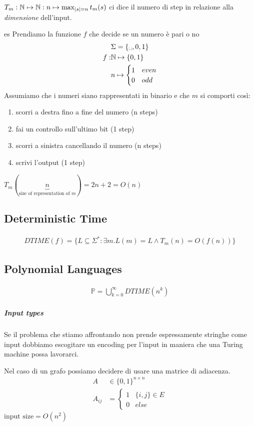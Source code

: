 \documentclass{article}
\newcommand{\tvs}[0]{\text{\textvisiblespace}}
\begin{document}
$T_m:\mathbb N\mapsto\mathbb N:n\mapsto \max_{|s|=n} t_m(s)$ ci dice il numero di step in relazione alla \textit{dimensione} dell'input.

\begin{callout}{es}
    Prendiamo la funzione $f$ che decide se un numero è pari o no 
    \begin{align*}
        &\Sigma=\{\tvs,0,1\} \\
        f:&\N\mapsto\{0,1\} \\
          &n\mapsto \begin{cases}
              1 & even \\
              0 & odd
          \end{cases}
    \end{align*}
    Assumiamo che i numeri siano rappresentati in binario e che $m$ si comporti così:
    \begin{enumerate}
        \item scorri a destra fino a fine del numero (n steps)
        \item fai un controllo sull'ultimo bit (1 step)
        \item scorri a sinistra cancellando il numero (n steps)
        \item scrivi l'output (1 step)
    \end{enumerate}
    $T_m(\underbrace{n}_{\text{size of representation of $m$}})=2n+2 = O(n)$
\end{callout}

\subsection{Deterministic Time}
\begin{align*}
    DTIME(f) = \{L\subseteq\Sigma^*:\exists m. L(m)=L\wedge T_m(n)=O(f(n))\}
\end{align*}

\subsection{Polynomial Languages}
\begin{align*}
    \mathbb{P} = \bigcup_{k=0}^\infty DTIME(n^k)
\end{align*}

\subparagraph{Input types}
Se il problema che stiamo affrontando non prende espressamente stringhe come input dobbiamo escogitare un encoding per l'input in maniera che una Turing machine possa lavorarci.

Nel caso di un grafo possiamo decidere di usare una matrice di adiacenza.
\begin{align*}
    A&\in\{0,1\}^{n\times n} \\
    A_{ij} &= \begin{cases}
        1 & \{i,j\} \in E \\
        0 & else
    \end{cases}
\end{align*}
$\text{input size} = O(n^2)$
\end{document}
